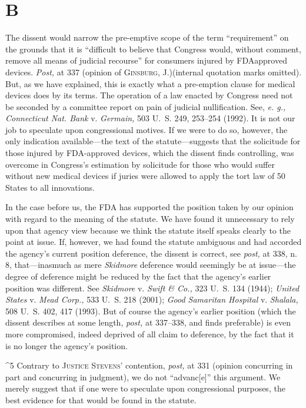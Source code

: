 {\section{B}

  The dissent would narrow the pre-emptive scope of the term
``requirement'' on the grounds that it is ``difficult to believe
that Congress would, without comment, remove all means of judicial
recourse'' for consumers injured by FDAapproved devices. \emph{Post,} at
337 (opinion of \textsc{Ginsburg, J.})(internal quotation marks omitted).
But, as we have explained, this is exactly what a pre-emption clause
for medical devices does by its terms. The operation of a law enacted
by Congress need not be seconded by a committee report on pain of
judicial nullification. See, \emph{e. g., Connecticut Nat. Bank} v.
\emph{Germain,} 503 U.~S. 249, 253--254 (1992). It is not our job to
speculate upon congressional motives. If we were to do so, however, the
only indication available---the text of the statute---suggests that the
solicitude for those injured by FDA-approved devices, which the dissent
finds controlling, was overcome in Congress's estimation by solicitude
for those who would suffer without new medical devices if juries were
allowed to apply the tort law of 50 States to all innovations.\footnotemark[5]

  In the case before us, the FDA has supported the position taken by
our opinion with regard to the meaning of the statute. We have found
it unnecessary to rely upon that agency view because we think the
statute itself speaks clearly to the point at issue. If, however, we
had found the statute ambiguous and had accorded the agency's current
position deference, the dissent is correct, see \emph{post,} at 338, n.
8, that---inasmuch as mere \emph{Skidmore} deference would seemingly be
at issue---the degree of deference might be reduced by the fact that
the agency's earlier position was different. See \emph{Skidmore} v.
\emph{Swift \& Co.,} 323 U.~S. 134 (1944); \emph{United States} \newpage  v.
\emph{Mead Corp.,} 533 U.~S. 218 (2001); \emph{Good Samaritan Hospital} v.
\emph{Shalala,} 508 U.~S. 402, 417 (1993). But of course the agency's
earlier position (which the dissent describes at some length, \emph{post,}
at 337--338, and finds preferable) is even more compromised, indeed
deprived of all claim to deference, by the fact that it is no longer the
agency's position.

^5 Contrary to \textsc{Justice Stevens'} contention, \emph{post,} at 331
(opinion concurring in part and concurring in judgment), we do not
``advanc[e]'' this argument. We merely suggest that if one were to
speculate upon congressional purposes, the best evidence for that would
be found in the statute.

}
